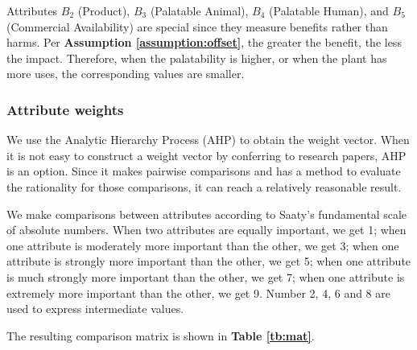 \documentclass[12pt]{article}
\begin{document}
		Attributes $B_2$ (Product), $B_3$ (Palatable Animal), $B_4$ (Palatable Human), and $B_5$ (Commercial Availability) are special since they measure benefits rather than harms.  Per \textbf{Assumption \ref{assumption:offset}}, the greater the benefit, the less the impact.  Therefore, when the palatability is higher, or when the plant has more uses, the corresponding values are smaller.
		
		\subsubsection{Attribute weights}
		\label{sec:attr_weight}
		
		We use the Analytic Hierarchy Process (AHP) to obtain the weight vector.  When it is not easy to construct a weight vector by conferring to research papers, AHP is an option.  Since it makes pairwise comparisons and has a method to evaluate the rationality for those comparisons, it can reach a relatively reasonable result.
		
		We make comparisons between attributes according to Saaty's fundamental scale of absolute numbers\autocite{AHP}.  When two attributes are equally important, we get 1; when one attribute is moderately more important than the other, we get 3; when one attribute is strongly more important than the other, we get 5; when one attribute is much strongly more important than the other, we get 7; when one attribute is extremely more important than the other, we get 9.  Number 2, 4, 6 and 8 are used to express intermediate values.  
		
		The resulting comparison matrix is shown in \textbf{Table \ref{tb:mat}}.
		
\end{document}
